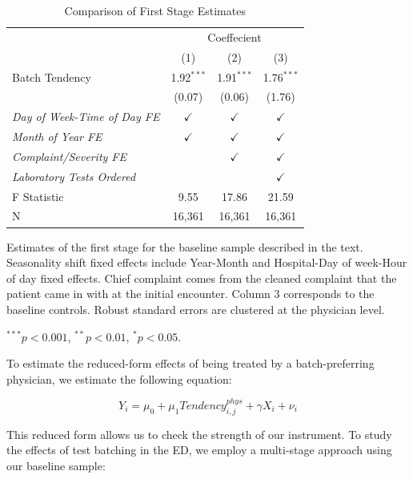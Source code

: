 \documentclass[,,nonblindrev]{informs}
\begin{document}
\begin{table}[!htbp] \centering 
  \caption{Comparison of First Stage Estimates}
  \label{table:first_stage}
  \begin{tabularx}{5.5in}{Xccc} %
  \toprule
   & \multicolumn{3}{c}{Coeffecient} \\
  \cmidrule{2-4}
   & (1) & (2) & (3) \\
  \midrule
  Batch Tendency & 1.92$^{***}$ & 1.91$^{***}$ & 1.76$^{***}$ \\ 
   & (0.07) & (0.06) & (1.76) \\ 
  \textit{Day of Week-Time of Day FE} & $\checkmark$ & $\checkmark$ & $\checkmark$ \\
  \textit{Month of Year FE} & $\checkmark$ & $\checkmark$ & $\checkmark$ \\
  \textit{Complaint/Severity FE} & & $\checkmark$ & $\checkmark$ \\
  \textit{Laboratory Tests Ordered} & & & $\checkmark$ \\
  \midrule
  F Statistic & 9.55 & 17.86 & 21.59 \\ 
  N & 16,361 & 16,361 & 16,361 \\ 
  \bottomrule
  \end{tabularx}
  \begin{tablenotes}
  \small
  \item Estimates of the first stage for the baseline sample described in the text. Seasonality shift fixed effects include Year-Month and Hospital-Day of week-Hour of day fixed effects. Chief complaint comes from the cleaned complaint that the patient came in with at the initial encounter. Column 3 corresponds to the baseline controls. Robust standard errors are clustered at the physician level.
  \item $^{***} p < 0.001$, $^{**} p < 0.01$, $^{*} p < 0.05$.
  \end{tablenotes}
\end{table}

To estimate the reduced-form effects of being treated by a
batch-preferring physician, we estimate the following equation:

\begin{equation}
Y_i = \mu_0 + \mu_1 Tendency_{i,j}^{phys} + \gamma X_i + \nu_i
\end{equation}

This reduced form allows us to check the strength of our instrument. To
study the effects of test batching in the ED, we employ a multi-stage
approach using our baseline sample:
\end{document}
